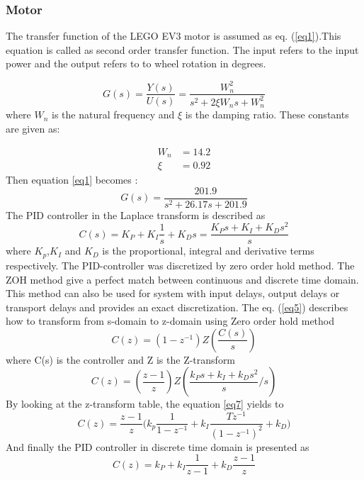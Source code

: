 \subsubsection{Motor}
The transfer function of the LEGO EV3 motor is assumed as eq. (\ref{eq1}).This equation is called as second order transfer function. The input refers to the input power and the output refers to to wheel rotation in degrees.

\begin{equation}\label{eq1}
    G(s)=\frac{Y(s)}{U(s)}=\frac{W_n^2}{s^2+2\xi W_n s + W_n^2}
\end{equation}
where $W_n$ is the natural frequency and $\xi$ is the damping ratio.  These constants are given as:

\begin{equation}
\begin{split}
     W_n & = 14.2 \\
    \xi & = 0.92 
\end{split}
\end{equation}
Then equation \ref{eq1} becomes : 
\begin{equation}
    G(s)=\frac{201.9}{s^2+26.17s+201.9}
\end{equation}
The PID controller in the Laplace transform is described as 
    \begin{equation}
    C(s)= K_P+K_I \frac{1}{s}+K_Ds= \frac{K_Ps+K_I+K_Ds^2}{s}
\end{equation}
where $K_p$,$K_I$ and $K_D$ is the proportional, integral and derivative terms respectively.
The PID-controller was discretized by zero order hold method. The ZOH method give a perfect match between continuous and discrete time domain. This method can also be used for system with input delays, output delays or transport delays and provides an exact discretization. 
The eq. (\ref{eq5}) describes how to transform from s-domain to z-domain using Zero order hold method
\begin{equation} \label{eq5}
    C(z)=(1-z^{-1}) Z(\frac{C(s)}{s}) 
\end{equation}
where C(s) is the controller and Z is the Z-transform
\begin{equation}
    C(z)=(\frac{z-1}{z})Z(\frac{k_Ps+k_I+k_Ds^2}{s} \Big/ s)
    \label{eq7}
\end{equation}
By looking at the z-transform table, the equation \ref{eq7} yields to
\begin{equation}
    C(z)=\frac{z-1}{z}\bigg( k_p \frac{1}{1-z^{-1}}+k_I \frac{T z^{-1}}{(1-z^{-1})^2}+k_D\bigg)
\end{equation}
And finally the PID controller in discrete time domain is presented as
\begin{equation}
    C(z)= k_P + k_I \frac{1}{z-1} + k_D \frac{z-1}{z}
\end{equation}

